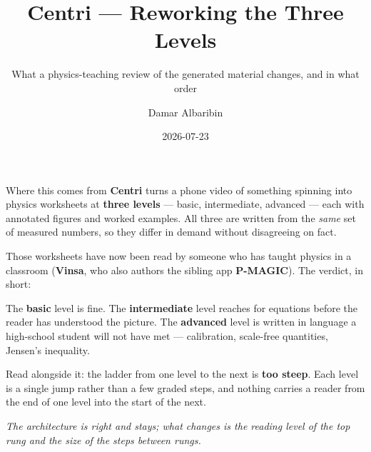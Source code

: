 \documentclass[aspectratio=169,10pt]{beamer}
\title{Centri --- Reworking the Three Levels}
\subtitle{What a physics-teaching review of the generated material changes, and in what order}
\author{Damar Albaribin}
\institute{MSc Thesis --- advisor: Prof.\ Wu-Yuin Hwang}
\date{2026-07-23 \quad {\scriptsize\color{cGrey}rough plan for discussion}}
\newcommand{\takeaway}[1]{\vfill{\footnotesize\itshape\color{cGrey}#1\par}}
\begin{document}
\maketitle

\begin{frame}{Where this comes from}
\small
\textbf{Centri} turns a phone video of something spinning into physics worksheets at \textbf{three
levels} --- basic, intermediate, advanced --- each with annotated figures and worked examples.
All three are written from the \emph{same} set of measured numbers, so they differ in demand
without disagreeing on fact.
\vspace{0.5em}

Those worksheets have now been read by someone who has taught physics in a classroom
(\textbf{Vinsa}, who also authors the sibling app \textbf{P-MAGIC}). The verdict, in short:
\vspace{0.4em}

\begin{tcolorbox}[colback=cPed!6,colframe=cPed,boxsep=2pt,left=6pt,right=6pt,top=3pt,bottom=3pt]
\small The \textbf{basic} level is fine. The \textbf{intermediate} level reaches for equations
before the reader has understood the picture. The \textbf{advanced} level is written in language a
high-school student will not have met --- calibration, scale-free quantities, Jensen's inequality.
\end{tcolorbox}
\vspace{0.5em}

\small Read alongside it: the ladder from one level to the next is \textbf{too steep}. Each level is
a single jump rather than a few graded steps, and nothing carries a reader from the end of one
level into the start of the next.
\takeaway{The architecture is right and stays; what changes is the reading level of the top rung and
the size of the steps between rungs.}
\end{frame}
\end{document}
